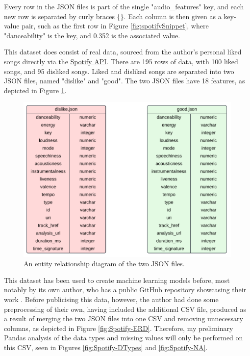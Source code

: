 \documentclass[12pt]{report}
\begin{document}
Every row in the JSON files is part of the single "audio\_features" key, and each new row is separated by curly braces \{\}. Each column is then given as a 
key-value pair, such as the first row in Figure \ref{fig:spotifySnippet}, where "danceability" is the key, and 0.352 is the associated value.

\noindent This dataset does consist of real data, sourced from the author's personal liked songs directly via the 
\href{https://developer.spotify.com/documentation/web-api}{Spotify API}. There are 195 rows of data, with 100 liked songs, and 95 disliked songs.
Liked and disliked songs are separated into two JSON files, named "dislike" and "good". The two JSON files have 18 features, as depicted in Figure 
\ref{fig:JSON-ERD}. 

\begin{figure}[H]
    \centering
    \includegraphics[width=.75\linewidth]{SpotifyJSON-ERD.png}
    \caption{An entity relationship diagram of the two JSON files.}
    \label{fig:JSON-ERD}
\end{figure}

This dataset has been used to create machine learning models before, most notably by its own author, who has a public GitHub repository 
showcasing their work \autocite{brice-vergnou_brice-vergnouspotify_recommendation_2024}. 
Before publicising this data, however, the author had done some preprocessing of their own, having included the additional CSV file,
produced as a result of merging the two JSON files into one CSV and removing unnecessary columns, as depicted in Figure \ref{fig:Spotify-ERD}.
Therefore, my preliminary Pandas analysis of the data types and missing values will only be performed on this CSV, seen in Figures \ref{fig:Spotify-DTypes}
and \ref{fig:Spotify-NA}.
\end{document}
